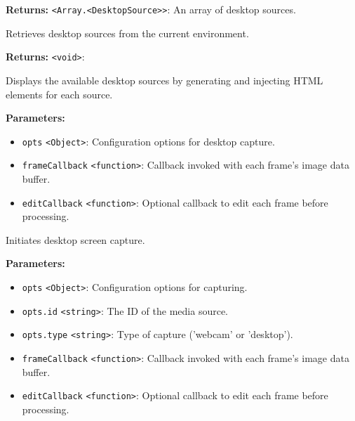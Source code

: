 \documentclass[12pt,a4paper]{article}
\begin{document}
\noindent \textbf{Returns:} \texttt{<Array.<DesktopSource>>}: An array of desktop sources.

\noindent Retrieves desktop sources from the current environment.

\vspace{5mm}
\noindent {}


\noindent \textbf{Returns:} \texttt{<void>}: 

\noindent Displays the available desktop sources by generating and injecting HTML elements for each source.

\vspace{5mm}
\noindent {}


\noindent \textbf{Parameters:}
\begin{itemize}
  \item \texttt{opts} \texttt{<Object>}: Configuration options for desktop capture.
  \item \texttt{frameCallback} \texttt{<function>}: Callback invoked with each frame's image data buffer.
  \item \texttt{editCallback} \texttt{<function>}: Optional callback to edit each frame before processing.
\end{itemize}

\noindent Initiates desktop screen capture.

\vspace{5mm}
\noindent {}


\noindent \textbf{Parameters:}
\begin{itemize}
  \item \texttt{opts} \texttt{<Object>}: Configuration options for capturing.
  \item \texttt{opts.id} \texttt{<string>}: The ID of the media source.
  \item \texttt{opts.type} \texttt{<string>}: Type of capture ('webcam' or 'desktop').
  \item \texttt{frameCallback} \texttt{<function>}: Callback invoked with each frame's image data buffer.
  \item \texttt{editCallback} \texttt{<function>}: Optional callback to edit each frame before processing.
\end{itemize}
\end{document}
